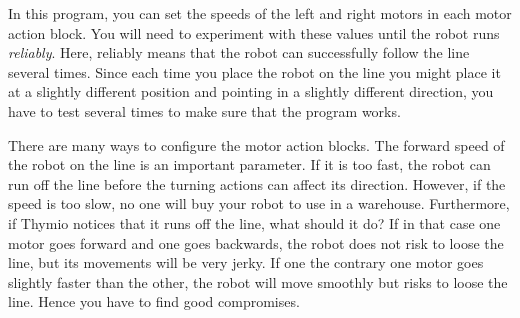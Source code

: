 In this program, you can set the speeds of the
left and right motors in each motor action block. You will need to
experiment with these values until the robot runs \emph{reliably}. Here,
reliably means that the robot can successfully follow the line several times.
Since each time you place the robot on
the line you might place it at a slightly different position and
pointing in a slightly different direction, you have to test several times to make sure that the program works.

There are many ways to configure the motor action blocks.
The forward speed of the robot on the line is an important parameter.
If it is too fast, the robot can run off the line before the turning actions can affect its direction. However, if the speed is too slow, no one will buy your robot to use in a warehouse.
Furthermore, if Thymio notices that it runs off the line, what should it do?
If in that case one motor goes forward and one goes backwards, the robot does not risk to loose the line, but its movements will be very jerky.
If one the contrary one motor goes slightly faster than the other, the robot will move smoothly but risks to loose the line.
Hence you have to find good compromises.


\vfill


\vfill


